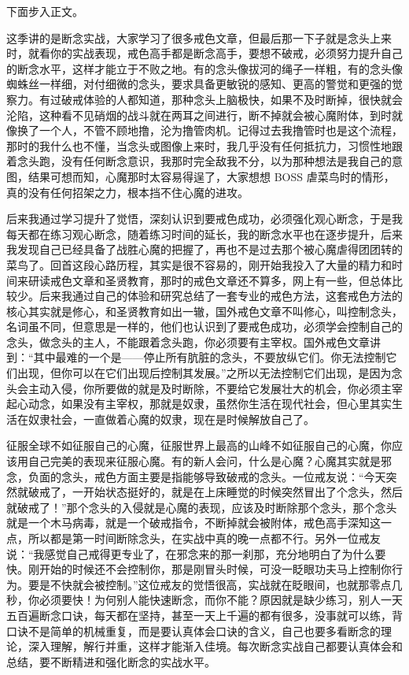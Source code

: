 下面步入正文。

这季讲的是断念实战，大家学习了很多戒色文章，但最后那一下子就是念头上来时，就看你的实战表现，戒色高手都是断念高手，要想不破戒，必须努力提升自己的断念水平，这样才能立于不败之地。有的念头像拔河的绳子一样粗，有的念头像蜘蛛丝一样细，对付细微的念头，要求具备更敏锐的感知、更高的警觉和更强的觉察力。有过破戒体验的人都知道，那种念头上脑极快，如果不及时断掉，很快就会沦陷，这种看不见硝烟的战斗就在两耳之间进行，断不掉就会被心魔附体，到时就像换了一个人，不管不顾地撸，沦为撸管肉机。记得过去我撸管时也是这个流程，那时的我什么也不懂，当念头或图像上来时，我几乎没有任何抵抗力，习惯性地跟着念头跑，没有任何断念意识，我那时完全敌我不分，以为那种想法是我自己的意图，结果可想而知，心魔那时太容易得逞了，大家想想 BOSS 虐菜鸟时的情形，真的没有任何招架之力，根本挡不住心魔的进攻。

后来我通过学习提升了觉悟，深刻认识到要戒色成功，必须强化观心断念，于是我每天都在练习观心断念，随着练习时间的延长，我的断念水平也在逐步提升，后来我发现自己已经具备了战胜心魔的把握了，再也不是过去那个被心魔虐得团团转的菜鸟了。回首这段心路历程，其实是很不容易的，刚开始我投入了大量的精力和时间来研读戒色文章和圣贤教育，那时的戒色文章还不算多，网上有一些，但总体比较少。后来我通过自己的体验和研究总结了一套专业的戒色方法，这套戒色方法的核心其实就是修心，和圣贤教育如出一辙，国外戒色文章不叫修心，叫控制念头，名词虽不同，但意思是一样的，他们也认识到了要戒色成功，必须学会控制自己的念头，做念头的主人，不能跟着念头跑，你必须要有主宰权。国外戒色文章讲到：“其中最难的一个是——停止所有肮脏的念头，不要放纵它们。你无法控制它们出现，但你可以在它们出现后控制其发展。”之所以无法控制它们出现，是因为念头会主动入侵，你所要做的就是及时断除，不要给它发展壮大的机会，你必须主宰起心动念，如果没有主宰权，那就是奴隶，虽然你生活在现代社会，但心里其实生活在奴隶社会，一直做着心魔的奴隶，现在是时候解放自己了。

征服全球不如征服自己的心魔，征服世界上最高的山峰不如征服自己的心魔，你应该用自己完美的表现来征服心魔。有的新人会问，什么是心魔？心魔其实就是邪念，负面的念头，戒色方面主要是指能够导致破戒的念头。一位戒友说：“今天突然就破戒了，一开始状态挺好的，就是在上床睡觉的时候突然冒出了个念头，然后就破戒了！”那个念头的入侵就是心魔的表现，应该及时断除那个念头，那个念头就是一个木马病毒，就是一个破戒指令，不断掉就会被附体，戒色高手深知这一点，所以都是第一时间断除念头，在实战中真的晚一点都不行。另外一位戒友说：“我感觉自己戒得更专业了，在邪念来的那一刹那，充分地明白了为什么要快。刚开始的时候还不会控制你，那是刚冒头时候，可没一眨眼功夫马上控制你行为。要是不快就会被控制。”这位戒友的觉悟很高，实战就在眨眼间，也就那零点几秒，你必须要快！为何别人能快速断念，而你不能？原因就是缺少练习，别人一天五百遍断念口诀，每天都在坚持，甚至一天上千遍的都有很多，没事就可以练，背口诀不是简单的机械重复，而是要认真体会口诀的含义，自己也要多看断念的理论，深入理解，解行并重，这样才能渐入佳境。每次断念实战自己都要认真体会和总结，要不断精进和强化断念的实战水平。

